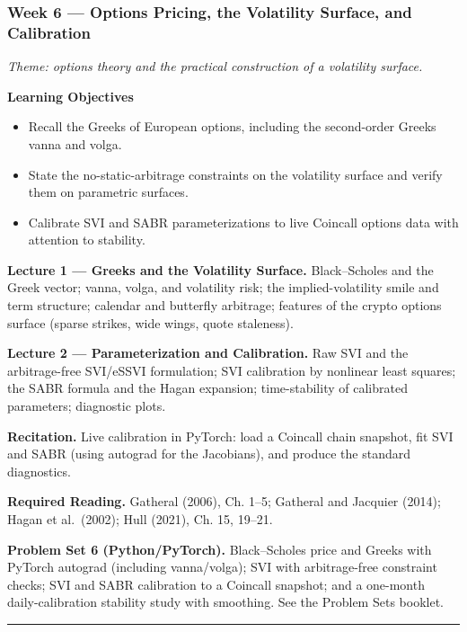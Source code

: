 \documentclass[
]{article}
\providecommand{\tightlist}{%
  \setlength{\itemsep}{0pt}\setlength{\parskip}{0pt}}
\begin{document}
\subsubsection{Week 6 --- Options Pricing, the Volatility Surface, and
Calibration}\label{week-6-options-pricing-the-volatility-surface-and-calibration}

\emph{Theme: options theory and the practical construction of a
volatility surface.}

\textbf{Learning Objectives}

\begin{itemize}
\tightlist
\item
  Recall the Greeks of European options, including the second-order
  Greeks vanna and volga.
\item
  State the no-static-arbitrage constraints on the volatility surface
  and verify them on parametric surfaces.
\item
  Calibrate SVI and SABR parameterizations to live Coincall options data
  with attention to stability.
\end{itemize}

\textbf{Lecture 1 --- Greeks and the Volatility Surface.} Black--Scholes
and the Greek vector; vanna, volga, and volatility risk; the
implied-volatility smile and term structure; calendar and butterfly
arbitrage; features of the crypto options surface (sparse strikes, wide
wings, quote staleness).

\textbf{Lecture 2 --- Parameterization and Calibration.} Raw SVI and the
arbitrage-free SVI/eSSVI formulation; SVI calibration by nonlinear least
squares; the SABR formula and the Hagan expansion; time-stability of
calibrated parameters; diagnostic plots.

\textbf{Recitation.} Live calibration in PyTorch: load a Coincall chain
snapshot, fit SVI and SABR (using autograd for the Jacobians), and
produce the standard diagnostics.

\textbf{Required Reading.} Gatheral (2006), Ch. 1--5; Gatheral and
Jacquier (2014); Hagan et al.~(2002); Hull (2021), Ch. 15, 19--21.

\textbf{Problem Set 6 (Python/PyTorch).} Black--Scholes price and Greeks
with PyTorch autograd (including vanna/volga); SVI with arbitrage-free
constraint checks; SVI and SABR calibration to a Coincall snapshot; and
a one-month daily-calibration stability study with smoothing. See the
Problem Sets booklet.

\begin{center}\rule{0.5\linewidth}{0.5pt}\end{center}
\end{document}
